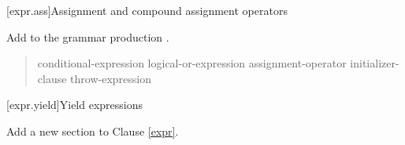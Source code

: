 %	
%

\setcounter{section}{17}
[expr.ass]{Assignment and compound assignment operators}%

Add  to the grammar production .

\begin{quote}
\begin{bnf}
  \br
  conditional-expression\br
  logical-or-expression assignment-operator initializer-clause\br
  throw-expression \br
\end{bnf}
\end{quote}

\setcounter{section}{20}
[expr.yield]{Yield expressions}%

Add a new section to Clause \ref{expr}.

